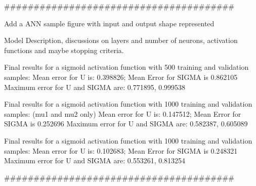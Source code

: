 \vspace{1cm}
\#\#\#\#\#\#\#\#\#\#\#\#\#\#\#\#\#\#\#\#\#\#\#\#\#\#\#\#\#\#\#\#\#\#\#\#\#\#\#

Add a ANN sample figure with input and output shape represented

Model Description, discussions on layers and number of neurons, activation functions and maybe stopping criteria. 


Final results for a sigmoid activation function with 500 training and validation samples:
Mean error for U is: 0.398826; Mean Error for SIGMA is 0.862105
Maximum error for U and SIGMA are: 0.771895, 0.999538

Final results for a sigmoid activation function with 1000 training and validation samples: (mu1 and mu2 only)
Mean error for U is: 0.147512; Mean Error for SIGMA is 0.252696
Maximum error for U and SIGMA are: 0.582387, 0.605089

Final results for a sigmoid activation function with 1000 training and validation samples: 
Mean error for U is: 0.102683; Mean Error for SIGMA is 0.248321
Maximum error for U and SIGMA are: 0.553261, 0.813254

\#\#\#\#\#\#\#\#\#\#\#\#\#\#\#\#\#\#\#\#\#\#\#\#\#\#\#\#\#\#\#\#\#\#\#\#\#\#\#

\newpage
